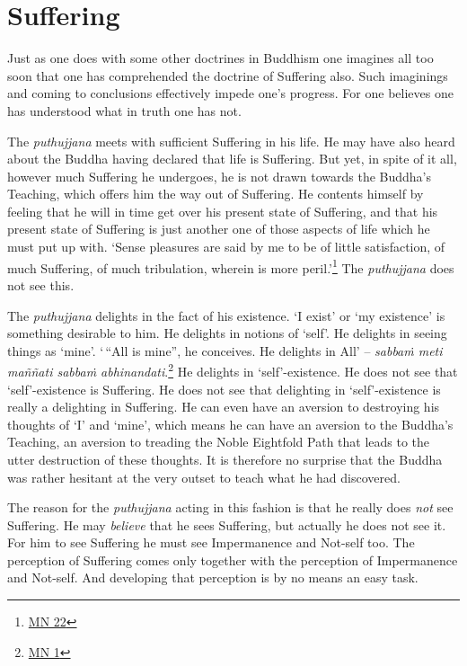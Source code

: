 \chapter{Suffering}

Just as one does with some other doctrines in Buddhism one imagines all too soon that one has comprehended the doctrine of Suffering also. Such imaginings and coming to conclusions effectively impede one's progress. For one believes one has understood what in truth one has not.

The \textit{puthujjana} meets with sufficient Suffering in his life. He may have also heard about the Buddha having declared that life is Suffering. But yet, in spite of it all, however much Suffering he undergoes, he is not drawn towards the Buddha's Teaching, which offers him the way out of Suffering. He contents himself by feeling that he will in time get over his present state of Suffering, and that his present state of Suffering is just another one of those aspects of life which he must put up with. `Sense pleasures are said by me to be of little satisfaction, of much Suffering, of much tribulation, wherein is more peril.'\footnote{\href{https://suttacentral.net/mn22/en/bodhi}{MN 22}} The \textit{puthujjana} does not see this.

The \textit{puthujjana} delights in the fact of his existence. `I exist' or `my existence' is something desirable to him. He delights in notions of `self'. He delights in seeing things as `mine'. `\,``All is mine'', he conceives. He delights in All' -- \textit{sabbaṁ meti maññati sabbaṁ abhinandati}.\footnote{\href{https://suttacentral.net/mn1/en/bodhi}{MN 1}} He delights in `self'-existence. He does not see that `self'-existence is Suffering. He does not see that delighting in `self'-existence is really a delighting in Suffering. He can even have an aversion to destroying his thoughts of `I' and `mine', which means he can have an aversion to the Buddha's Teaching, an aversion to treading the Noble Eightfold Path that leads to the utter destruction of these thoughts. It is therefore no surprise that the Buddha was rather hesitant at the very outset to teach what he had discovered.

The reason for the \textit{puthujjana} acting in this fashion is that he really does \emph{not} see Suffering. He may \emph{believe} that he sees Suffering, but actually he does not see it. For him to see Suffering he must see Impermanence and Not-self too. The perception of Suffering comes only together with the perception of Impermanence and Not-self. And developing that perception is by no means an easy task.

